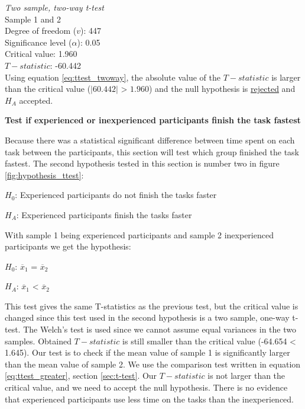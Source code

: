  \begin{center}
	\begin{tcolorbox}[width=0.8\textwidth]
		\centering
		\textit{Two sample, two-way t-test}\\
		Sample 1 and 2\\[0.5cm]
		
		Degree of freedom ($v$): 447 \\ %
		Significance level ($\alpha$): 0.05 \\
		Critical value: 1.960\\[0.2cm]
		$T-statistic$: -60.442 \\
		
		Using equation \ref{eq:ttest_twoway}, the absolute value of the $T-statistic$ is larger than the critical value ($|60.442|$ > $1.960$) and the null hypothesis is \underline{rejected} and $H_A$ accepted.\\[0.5cm]

	\end{tcolorbox} 
\end{center}

\vspace{0.5cm}

\textbf{Test if experienced or inexperienced participants finish the task fastest} 

Because there was a statistical significant difference between time spent on each task between the participants, this section will test which group finished the task fastest. The second hypothesis tested in this section is number two in figure \ref{fig:hypothesis_ttest}:\newline

\centerline{$H_{0}$: Experienced participants do not finish the tasks faster}
\centerline{$H_{A}$: Experienced participants finish the tasks faster}

With sample 1 being experienced participants and sample 2 inexperienced participants we get the hypothesis:\\[0.2cm]

\centerline{$H_{0}$: $\overline{x}_1$ = $\overline{x}_2$}
\centerline{$H_{A}$: $\overline{x}_1$ < $\overline{x}_2$}

This test gives the same T-statistics as the previous test, but the critical value is changed since this test used in the second hypothesis is a two sample, one-way t-test. The Welch's test is used since we cannot assume equal variances in the two samples. Obtained $T-statistic$ is still smaller than the critical value (-64.654 < 1.645). Our test is to check if the mean value of sample 1 is significantly larger than the mean value of sample 2. We use the comparison test written in equation \ref{eq:ttest_greater}, section \ref{sec:t-test}. Our $T-statistic$ is not larger than the critical value, and we need to accept the null hypothesis. There is no evidence that experienced participants use less time on the tasks than the inexperienced. \\[0.2cm]

